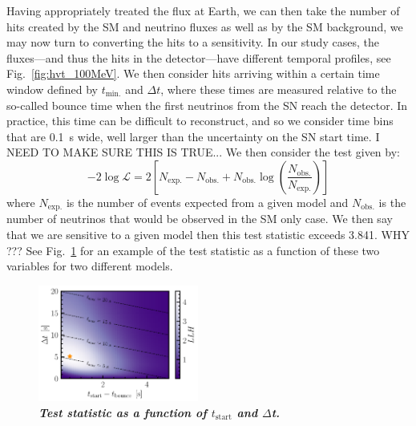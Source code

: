 Having appropriately treated the flux at Earth, we can then take the number of hits created by the SM and neutrino fluxes as well as by the SM background, we may now turn to converting the hits to a sensitivity.
In our study cases, the fluxes---and thus the hits in the detector---have different temporal profiles, see Fig.~\ref{fig:hvt_100MeV}.
We then consider hits arriving within a certain time window defined by $t_{\mathrm{min.}}$ and $\Delta t$, where these times are measured relative to the so-called bounce time when the first neutrinos from the SN reach the detector.
In practice, this time can be difficult to reconstruct, and so we consider time bins that are 0.1~s wide, well larger than the uncertainty on the SN start time.
I NEED TO MAKE SURE THIS IS TRUE...
We then consider the test given by:
$$
-2\log\mathcal{L} = 2\left[N_{\mathrm{exp.}} - N_{\mathrm{obs.}} + N_{\mathrm{obs.}} \log\left(\frac{N_{\mathrm{obs.}}}{N_{\mathrm{exp.}}}\right)\right]
$$
where $N_{\mathrm{exp.}}$ is the number of events expected from a given model and $N_{\mathrm{obs.}}$ is the number of neutrinos that would be observed in the SM only case.
We then say that we are sensitive to a given model then this test statistic exceeds 3.841. WHY ???
See Fig.~\ref{fig:sensitivity_heatmap} for an example of the test statistic as a function of these two variables for two different models.

\begin{figure}
    \centering
    \includegraphics[width=0.47\textwidth]{figures/100MeV_sensitivity_heatmap.pdf}
    \caption{\textbf{\textit{Test statistic as a function of $t_{\mathrm{start}}$ and $\Delta$t.}
    }}
    \label{fig:sensitivity_heatmap}
\end{figure}